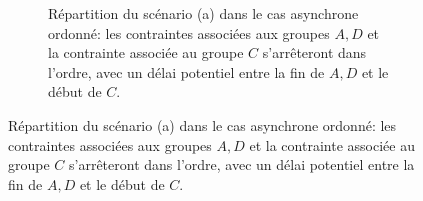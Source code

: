 \documentclass{article}
\begin{document}
\begin{figure}[h]
	\centering
	\ContinuedFloat
	\begin{subfigure}{.5\linewidth}
		\caption{Répartition du scénario (a) dans le cas asynchrone ordonné: les contraintes associées aux groupes $A,D$ et la contrainte associée au groupe $C$ s'arrêteront dans l'ordre, avec un délai potentiel entre la fin de $A,D$ et le début de $C$.}
	\end{subfigure}
	
\end{figure}
\end{document}

